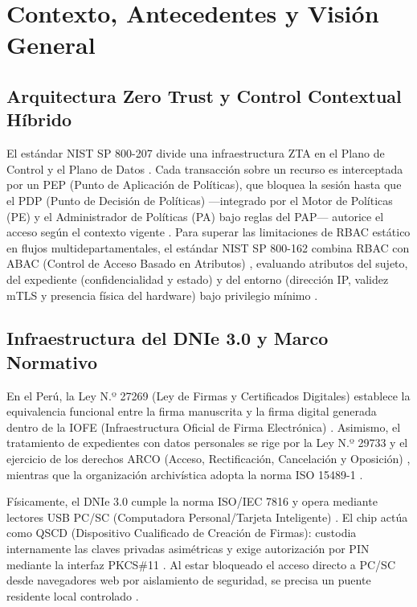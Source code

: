 \documentclass[runningheads,twocolumn]{llncs}
\begin{document}
\section{Contexto, Antecedentes y Visión General}\label{sec:background}

\subsection{Arquitectura Zero Trust y Control Contextual Híbrido}
El estándar NIST SP 800-207 divide una infraestructura ZTA en el Plano de Control y el Plano de Datos \cite{rose2020,nam2026}. Cada transacción sobre un recurso es interceptada por un PEP (Punto de Aplicación de Políticas), que bloquea la sesión hasta que el PDP (Punto de Decisión de Políticas) ---integrado por el Motor de Políticas (PE) y el Administrador de Políticas (PA) bajo reglas del PAP--- autorice el acceso según el contexto vigente \cite{soni2026,nam2026}. Para superar las limitaciones de RBAC estático en flujos multidepartamentales, el estándar NIST SP 800-162 combina RBAC con ABAC (Control de Acceso Basado en Atributos) \cite{hu2014,swapna2026}, evaluando atributos del sujeto, del expediente (confidencialidad y estado) y del entorno (dirección IP, validez mTLS y presencia física del hardware) bajo privilegio mínimo \cite{soni2026,sethi2026,alenezi2026}.

\subsection{Infraestructura del DNIe 3.0 y Marco Normativo}
En el Perú, la Ley N.º 27269 (Ley de Firmas y Certificados Digitales) establece la equivalencia funcional entre la firma manuscrita y la firma digital generada dentro de la IOFE (Infraestructura Oficial de Firma Electrónica) \cite{ley27269,reniec2025}. Asimismo, el tratamiento de expedientes con datos personales se rige por la Ley N.º 29733 y el ejercicio de los derechos ARCO (Acceso, Rectificación, Cancelación y Oposición) \cite{ley29733}, mientras que la organización archivística adopta la norma ISO 15489-1 \cite{iso15489}.

Físicamente, el DNIe 3.0 cumple la norma ISO/IEC 7816 y opera mediante lectores USB PC/SC (Computadora Personal/Tarjeta Inteligente) \cite{reniec2025,liu2026}. El chip actúa como QSCD (Dispositivo Cualificado de Creación de Firmas): custodia internamente las claves privadas asimétricas y exige autorización por PIN mediante la interfaz PKCS\#11 \cite{reniec2025,doynov2026}. Al estar bloqueado el acceso directo a PC/SC desde navegadores web por aislamiento de seguridad, se precisa un puente residente local controlado \cite{liu2026,satybaldy2022}.
\end{document}
